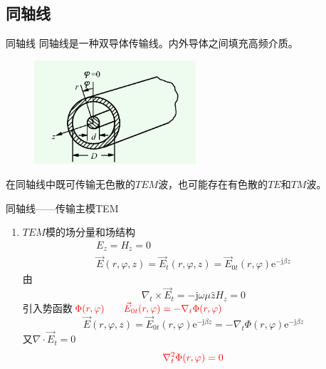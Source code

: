 \subsection{同轴线}
\begin{frame}{同轴线}
    同轴线是一种双导体传输线。内外导体之间填充高频介质。
    \begin{figure}
        \includegraphics[width=6cm]{Cha6//fig6-29.png}
    \end{figure}
    在同轴线中既可传输无色散的$TEM$波，也可能存在有色散的$TE$和$TM$波。
\end{frame}

\begin{frame}{同轴线——传输主模TEM}
    \begin{enumerate}
        \item $TEM$模的场分量和场结构
        \begin{gather*}
            E_z=H_z=0\\
            \vec{E}(r,\varphi,z)=\vec{E}_t(r,\varphi,z)=\vec{E}_{0t}(r,\varphi)\mathrm{e}^{-\mathrm{j}\beta z}
        \end{gather*}
        由
        $$\nabla_t\times \vec{E}_t=-\mathrm{j}\omega\mu\hat{z}H_z=0$$
        引入势函数$\color{red}{\Phi(r,\varphi)\qquad \vec{E}_{0t}(r,\varphi)=-\nabla_t\Phi(r,\varphi)}$
        $$\vec{E}(r,\varphi,z)=\vec{E}_{0t}(r,\varphi)\mathrm{e}^{-\mathrm{j}\beta z}=-\nabla_t\Phi(r,\varphi)\mathrm{e}^{-\mathrm{j}\beta z}$$
        又$\nabla\cdot \vec{E}_t=0$
        $$\color{red}{\nabla_t^2\Phi(r,\varphi)=0}$$
        \saveenum
    \end{enumerate}
\end{frame}

